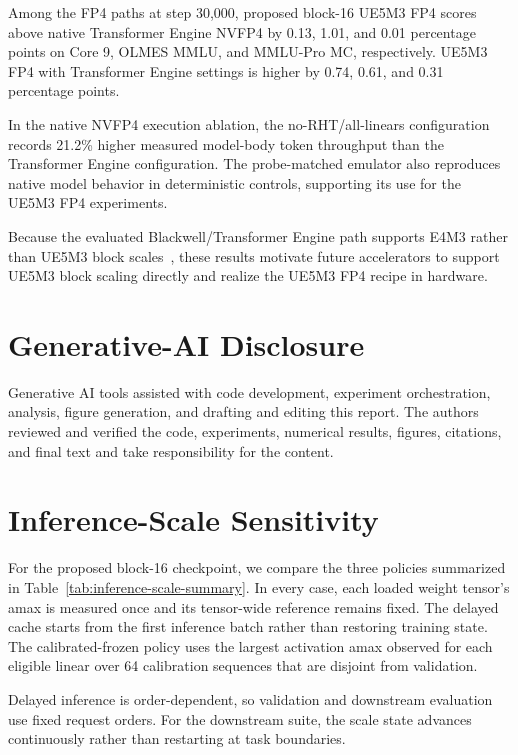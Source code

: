 \documentclass[11pt]{article}
\newcommand{\ue}{UE5M3}
\newcommand{\uefp}{UE5M3 FP4}
\newcommand{\nv}{NVFP4}
\begin{document}
Among the FP4 paths at step 30,000, proposed block-16 \uefp{} scores above
native Transformer Engine \nv{} by 0.13, 1.01, and 0.01 percentage points on
Core 9, OLMES MMLU, and MMLU-Pro MC, respectively.  \uefp{} with Transformer
Engine settings is higher by 0.74, 0.61, and 0.31 percentage points.

In the native \nv{} execution ablation, the no-RHT/all-linears configuration
records 21.2\% higher measured model-body token throughput than the Transformer
Engine configuration.
The probe-matched emulator also reproduces native model behavior in
deterministic controls, supporting its use for the \uefp{} experiments.

Because the evaluated Blackwell/Transformer Engine path supports E4M3 rather
than \ue{} block scales~\citep{nvidia2026tedocs}, these results motivate future
accelerators to support \ue{} block scaling directly and realize the \uefp{}
recipe in hardware.

\section*{Generative-AI Disclosure}

Generative AI tools assisted with code development, experiment orchestration,
analysis, figure generation, and drafting and editing this report.  The authors
reviewed and verified the code, experiments, numerical results, figures,
citations, and final text and take responsibility for the content.




\clearpage
\appendix

\section{Inference-Scale Sensitivity}
\label{app:inference-policies}

For the proposed block-16 checkpoint, we compare the three policies summarized
in Table~\ref{tab:inference-scale-summary}.  In every case, each loaded weight
tensor's amax is measured once and its tensor-wide reference remains fixed.
The delayed cache starts from the first inference batch rather than restoring
training state.  The calibrated-frozen policy uses the largest activation amax
observed for each eligible linear over 64 calibration sequences that are
disjoint from validation.

Delayed inference is order-dependent, so validation and downstream evaluation
use fixed request orders.  For the downstream suite, the scale state advances
continuously rather than restarting at task boundaries.
\end{document}
